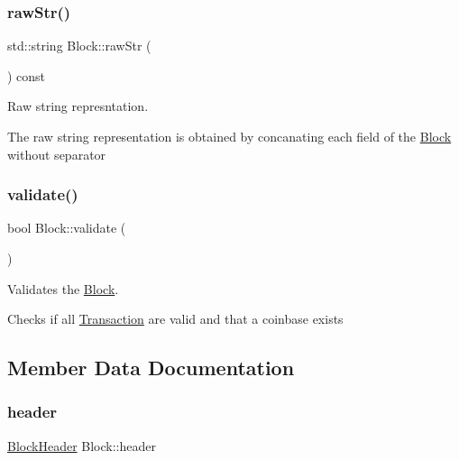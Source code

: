 \subsubsection{\texorpdfstring{raw\+Str()}{rawStr()}}
{\footnotesize\ttfamily std\+::string Block\+::raw\+Str (\begin{DoxyParamCaption}{ }\end{DoxyParamCaption}) const}



Raw string represntation. 

The raw string representation is obtained by concanating each field of the \mbox{\hyperlink{classBlock}{Block}} without separator \mbox{\label{classBlock_a95b93fe89c43e5528e26316c6bb0af50}} 
\subsubsection{\texorpdfstring{validate()}{validate()}}
{\footnotesize\ttfamily bool Block\+::validate (\begin{DoxyParamCaption}{ }\end{DoxyParamCaption})}



Validates the \mbox{\hyperlink{classBlock}{Block}}. 

Checks if all \mbox{\hyperlink{classTransaction}{Transaction}} are valid and that a coinbase exists 

\subsection{Member Data Documentation}
\mbox{\label{classBlock_ae86925a120ca16a078a4fa44cd3e493a}} 
\subsubsection{\texorpdfstring{header}{header}}
{\footnotesize\ttfamily \mbox{\hyperlink{structBlockHeader}{Block\+Header}} Block\+::header\hspace{0.3cm}{\ttfamily [private]}}

\mbox{\label{classBlock_a871f51555b26a13d77a437a0255804f5}} 
